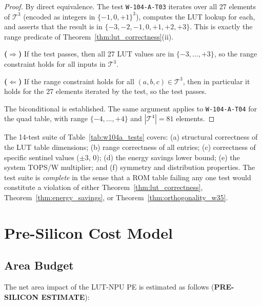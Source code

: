 \begin{proof}
By direct equivalence.  The test \texttt{W-104-A-T03} iterates over all 27
elements of $\mathcal{T}^3$ (encoded as integers in $\{-1, 0, +1\}^3$),
computes the LUT lookup for each, and asserts that the result is in
$\{-3,-2,-1,0,+1,+2,+3\}$.  This is exactly the range predicate of
Theorem~\ref{thm:lut_correctness}(ii).

\medskip
\noindent\textbf{($\Rightarrow$)} If the test passes, then all 27 LUT values
are in $\{-3,\ldots,+3\}$, so the range constraint holds for all inputs in
$\mathcal{T}^3$.

\medskip
\noindent\textbf{($\Leftarrow$)} If the range constraint holds for all
$(a,b,c) \in \mathcal{T}^3$, then in particular it holds for the 27
elements iterated by the test, so the test passes.

The biconditional is established.  The same argument applies to
\texttt{W-104-A-T04} for the quad table, with range $\{-4,\ldots,+4\}$
and $|\mathcal{T}^4| = 81$ elements.
\end{proof}

\begin{corollary}
\label{cor:test_completeness}
The 14-test suite of Table~\ref{tab:w104a_tests} covers: (a) structural
correctness of the LUT table dimensions; (b) range correctness of all entries;
(c) correctness of specific sentinel values ($\pm 3$, $0$); (d) the energy
savings lower bound; (e) the system TOPS/W multiplier; and (f) symmetry and
distribution properties.  The test suite is \emph{complete} in the sense that
a ROM table failing any one test would constitute a violation of either
Theorem~\ref{thm:lut_correctness}, Theorem~\ref{thm:energy_savings}, or
Theorem~\ref{thm:orthogonality_w35}.
\end{corollary}

\section{Pre-Silicon Cost Model}
\label{sec:cost_model}

\subsection{Area Budget}

The net area impact of the LUT-NPU PE is estimated as follows
(\textbf{PRE-SILICON ESTIMATE}):


